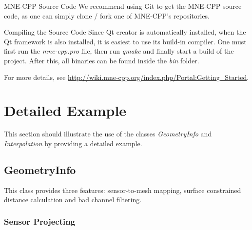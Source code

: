 \begin{aims}
	\item[\hspace*{11mm} MNE-CPP Source Code] We recommend using Git to get the MNE-CPP source code, as one can simply clone / fork one of MNE-CPP's repositories.
\end{aims}

\begin{aims}
	\item[\hspace*{11mm} Compiling the Source Code] Since Qt creator is automatically installed, when the Qt framework is also installed, it is easiest to use its build-in compiler. One must first run the \textit{mne-cpp.pro} file, then run \textit{qmake} and finally start a build of the project. After this, all binaries can be found inside the \textit{bin} folder.
\end{aims}

For more details, see \url{http://wiki.mne-cpp.org/index.php/Portal:Getting_Started}.

\clearpage

\section{Detailed Example}

This section should illustrate the use of the classes \textit{GeometryInfo} and \textit{Interpolation} by providing a detailed example.

\subsection{GeometryInfo}

This class provides three features: sensor-to-mesh mapping, surface constrained distance calculation and bad channel filtering.

\subsubsection{Sensor Projecting}

